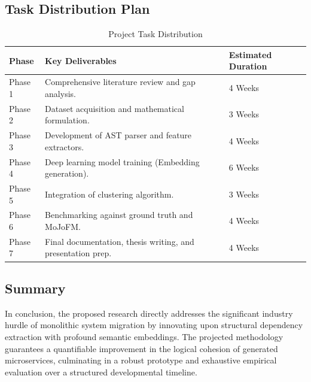\documentclass[12pt, a4paper]{article}
\begin{document}
\subsection{Task Distribution Plan}
\begin{table}[htbp]
\centering
\caption{Project Task Distribution}
\label{tab:task_distribution}
\begin{tabularx}{\textwidth}{@{}l >{\raggedright\arraybackslash}X l@{}}
\toprule
\textbf{Phase} & \textbf{Key Deliverables} & \textbf{Estimated Duration} \\
\midrule
Phase 1 & Comprehensive literature review and gap analysis. & 4 Weeks \\
Phase 2 & Dataset acquisition and mathematical formulation. & 3 Weeks \\
Phase 3 & Development of AST parser and feature extractors. & 4 Weeks \\
Phase 4 & Deep learning model training (Embedding generation). & 6 Weeks \\
Phase 5 & Integration of clustering algorithm. & 3 Weeks \\
Phase 6 & Benchmarking against ground truth and MoJoFM. & 4 Weeks \\
Phase 7 & Final documentation, thesis writing, and presentation prep. & 4 Weeks \\
\bottomrule
\end{tabularx}
\end{table}

\subsection{Summary}
In conclusion, the proposed research directly addresses the significant industry hurdle of monolithic system migration by innovating upon structural dependency extraction with profound semantic embeddings. The projected methodology guarantees a quantifiable improvement in the logical cohesion of generated microservices, culminating in a robust prototype and exhaustive empirical evaluation over a structured developmental timeline.

\newpage


\end{document}
